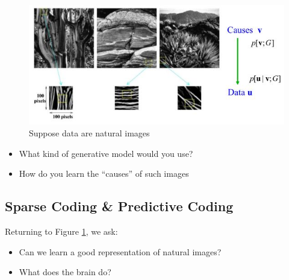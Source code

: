 \documentclass[]{article}
\begin{document}
\begin{figure}[H]
	\begin{center}
		\caption{Suppose data are natural images}\label{fig:suppose-data-are-natural-images}
		\includegraphics[width=\textwidth]{suppose-data-are-natural-images}
	\end{center}
\end{figure}

\begin{itemize}
	\item What kind of generative model would you use?
	\item How do you learn the “causes” of such images
\end{itemize}

\subsection{Sparse Coding \& Predictive Coding}

Returning to Figure \ref{fig:suppose-data-are-natural-images}, we ask:
\begin{itemize}
	\item Can we learn a good representation of natural images?
	\item What does the brain do?
\end{itemize}
\end{document}
